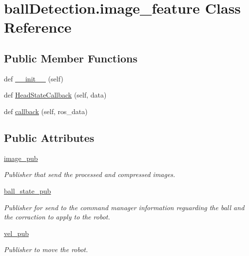 \hypertarget{classballDetection_1_1image__feature}{}\section{ball\+Detection.\+image\+\_\+feature Class Reference}
\label{classballDetection_1_1image__feature}
\subsection*{Public Member Functions}
\begin{DoxyCompactItemize}
\item 
def \hyperlink{classballDetection_1_1image__feature_a2de14dc8844b7778faaae3f1abc06064}{\+\_\+\+\_\+init\+\_\+\+\_\+} (self)
\item 
def \hyperlink{classballDetection_1_1image__feature_a7943b65b893b102334cb17c7bd3a1776}{Head\+State\+Callback} (self, data)
\item 
def \hyperlink{classballDetection_1_1image__feature_a7a61e6b57cc0b58d4ae4ca531fa8bbd0}{callback} (self, ros\+\_\+data)
\end{DoxyCompactItemize}
\subsection*{Public Attributes}
\begin{DoxyCompactItemize}
\item 
\hyperlink{classballDetection_1_1image__feature_a7873b5a7def0a26beb3bb7d08d51d5fe}{image\+\_\+pub}
\begin{DoxyCompactList}\small\item\em Publisher that send the processed and compressed images. \end{DoxyCompactList}\item 
\hyperlink{classballDetection_1_1image__feature_a5fa76faf1ca73df49668bbfbd6359ca6}{ball\+\_\+state\+\_\+pub}
\begin{DoxyCompactList}\small\item\em Publisher for send to the command manager information reguarding the ball and the corraction to apply to the robot. \end{DoxyCompactList}\item 
\hyperlink{classballDetection_1_1image__feature_a5097b180a748b724b36f9f77deddd703}{vel\+\_\+pub}
\begin{DoxyCompactList}\small\item\em Publisher to move the robot. \end{DoxyCompactList}\end{DoxyCompactItemize}
